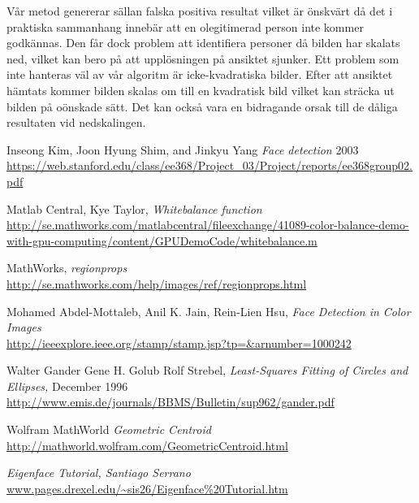 \documentclass[a4paper,12pt,oneside,final]{extbook}
\begin{document}
Vår metod genererar sällan falska positiva resultat vilket är önskvärt då det i praktiska sammanhang innebär att en olegitimerad person inte kommer godkännas. Den får dock problem att identifiera personer då bilden har skalats ned, vilket kan bero på att upplösningen på ansiktet sjunker. Ett problem som inte hanteras väl av vår algoritm är icke-kvadratiska bilder. Efter att ansiktet hämtats kommer bilden skalas om till en kvadratisk bild vilket kan sträcka ut bilden på oönskade sätt. Det kan också vara en bidragande orsak till de dåliga resultaten vid nedskalingen.

\begin{thebibliography}{99}

Inseong Kim, Joon Hyung Shim, and Jinkyu Yang \emph{Face detection} 2003
\url{https://web.stanford.edu/class/ee368/Project_03/Project/reports/ee368group02.pdf}

Matlab Central, Kye Taylor,\emph{ Whitebalance function } \\
\url{http://se.mathworks.com/matlabcentral/fileexchange/41089-color-balance-demo-with-gpu-computing/content/GPUDemoCode/whitebalance.m}


MathWorks,\emph{ regionprops } \\
\url{http://se.mathworks.com/help/images/ref/regionprops.html}

Mohamed Abdel-Mottaleb, Anil K. Jain, Rein-Lien Hsu,\emph{ Face Detection in Color Images} \\
\url{http://ieeexplore.ieee.org/stamp/stamp.jsp?tp=&arnumber=1000242}

Walter Gander Gene H. Golub Rolf Strebel, \emph{Least-Squares Fitting of Circles and Ellipses,} December 1996
\url{http://www.emis.de/journals/BBMS/Bulletin/sup962/gander.pdf}

Wolfram MathWorld \emph{Geometric Centroid } \\
\url{http://mathworld.wolfram.com/GeometricCentroid.html}

\emph{Eigenface Tutorial, Santiago Serrano} \\
\url{www.pages.drexel.edu/~sis26/Eigenface%20Tutorial.htm}

\end{thebibliography}


\appendix
\end{document}
